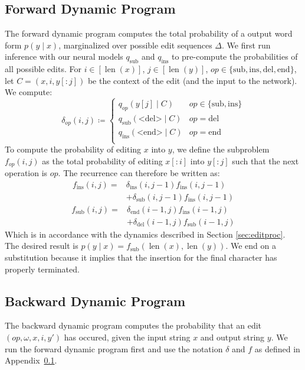 \documentclass[11pt]{article}
\DeclareMathOperator{\len}{len}
\begin{document}
\subsection{Forward Dynamic Program}
\label{appendix:fdp}
The forward dynamic program computes the total probability of a output word form $p(y \mid x)$, marginalized over possible edit sequences $\Delta$. 
We first run inference with our neural models $q_\text{sub}$ and $q_\text{ins}$ to pre-compute the probabilities of all possible edits. For $i \in [\len(x)]$, $j \in [\len(y)]$, $op \in \{\text{sub}, \text{ins}, \text{del}, \text{end}\}$, let $C=(x, i, y[{:}j])$ be the context of the edit (and the input to the network). We compute:
\[
    \delta_{op}(i, j) \coloneqq
    \begin{cases}
        q_{op}(y[j] \mid C) & op \in \{\text{sub}, \text{ins}\}\\
        q_{\text{sub}}(\text{<del>} \mid C) & op=\text{del} \\
        q_{\text{ins}}(\text{<end>} \mid C) & op=\text{end} \\
    \end{cases}
\]
To compute the probability of editing $x$ into $y$, we define the subproblem $f_{op}(i, j)$ as the total probability of editing $x[{:}i]$ into $y[{:}j]$ such that the next operation is $op$. The recurrence can therefore be written as:
\[
\begin{split}
f_{\text{ins}}(i, j) = &\delta_{\text{ins}}(i, j-1) f_{\text{ins}}(i, j-1) \\& + \delta_{\text{sub}}(i, j-1) f_{\text{ins}}(i, j-1)
\end{split}\]
\[
\begin{split}
f_{\text{sub}}(i, j) = &\delta_{\text{end}}(i-1, j) f_{\text{ins}}(i-1, j) \\& + \delta_{\text{del}}(i-1, j) f_{\text{sub}}(i-1, j)
\end{split}\]
Which is in accordance with the dynamics described in Section \ref{sec:editproc}. The desired result is $p(y \mid x) =f_\text{sub}(\len(x), \len(y))$. We end on a substitution because it implies that the insertion for the final character has properly terminated. 

\subsection{Backward Dynamic Program}
\label{appendix:bdp}
The backward dynamic program computes the probability that an edit $(op, \omega, x, i, y')$ has occured, given the input string $x$ and output string $y$. We run the forward dynamic program first and use the notation $\delta$ and $f$ as defined in Appendix~\ref{appendix:fdp}. 
\end{document}
